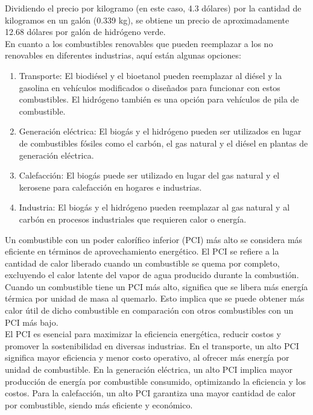 Dividiendo el precio por kilogramo (en este caso, 4.3 dólares) por la cantidad de kilogramos en un galón (0.339 kg), se obtiene un precio de aproximadamente 12.68 dólares por galón de hidrógeno verde.\\


En cuanto a los combustibles renovables que pueden reemplazar a los no renovables en diferentes industrias, aquí están algunas opciones:\\
\begin{enumerate}
\item 
Transporte: El biodiésel y el bioetanol pueden reemplazar al diésel y la gasolina en vehículos modificados o diseñados para funcionar con estos combustibles. El hidrógeno también es una opción para vehículos de pila de combustible.
\item 
Generación eléctrica: El biogás y el hidrógeno pueden ser utilizados en lugar de combustibles fósiles como el carbón, el gas natural y el diésel en plantas de generación eléctrica.
\item 
Calefacción: El biogás puede ser utilizado en lugar del gas natural y el kerosene para calefacción en hogares e industrias.
\item 
Industria: El biogás y el hidrógeno pueden reemplazar al gas natural y al carbón en procesos industriales que requieren calor o energía.\\
\end{enumerate}

Un combustible con un poder calorífico inferior (PCI) más alto se considera más eficiente en términos de aprovechamiento energético. El PCI se refiere a la cantidad de calor liberado cuando un combustible se quema por completo, excluyendo el calor latente del vapor de agua producido durante la combustión.\\

Cuando un combustible tiene un PCI más alto, significa que se libera más energía térmica por unidad de masa al quemarlo. Esto implica que se puede obtener más calor útil de dicho combustible en comparación con otros combustibles con un PCI más bajo.\\

El PCI es esencial para maximizar la eficiencia energética, reducir costos y promover la sostenibilidad en diversas industrias. En el transporte, un alto PCI significa mayor eficiencia y menor costo operativo, al ofrecer más energía por unidad de combustible. En la generación eléctrica, un alto PCI implica mayor producción de energía por combustible consumido, optimizando la eficiencia y los costos. Para la calefacción, un alto PCI garantiza una mayor cantidad de calor por combustible, siendo más eficiente y económico.\\

